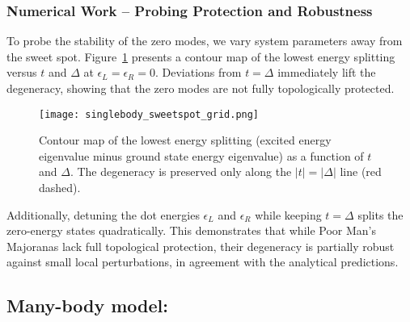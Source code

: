 \documentclass[11pt, letterpaper, titlepage]{article}
\begin{document}
\subsubsection{Numerical Work – Probing Protection and Robustness}

To probe the stability of the zero modes, we vary system parameters away from the sweet spot. Figure~\ref{fig:sb_grid} presents a contour map of the lowest energy splitting versus $t$ and $\Delta$ at $\epsilon_L = \epsilon_R = 0$. Deviations from $t = \Delta$ immediately lift the degeneracy, showing that the zero modes are not fully topologically protected.

\begin{figure}[htbp]
  \centering
  \texttt{[image: singlebody\_sweetspot\_grid.png]}
  \caption{Contour map of the lowest energy splitting (excited energy eigenvalue minus ground state energy eigenvalue) as a function of $t$ and $\Delta$. The degeneracy is preserved only along the $|t| = |\Delta|$ line (red dashed).}
  \label{fig:sb_grid}
\end{figure}

Additionally, detuning the dot energies $\epsilon_L$ and $\epsilon_R$ while keeping $t = \Delta$ splits the zero-energy states quadratically. This demonstrates that while Poor Man’s Majoranas lack full topological protection, their degeneracy is partially robust against small local perturbations, in agreement with the analytical predictions.
\newpage
\subsection{Many-body model:}
\end{document}
